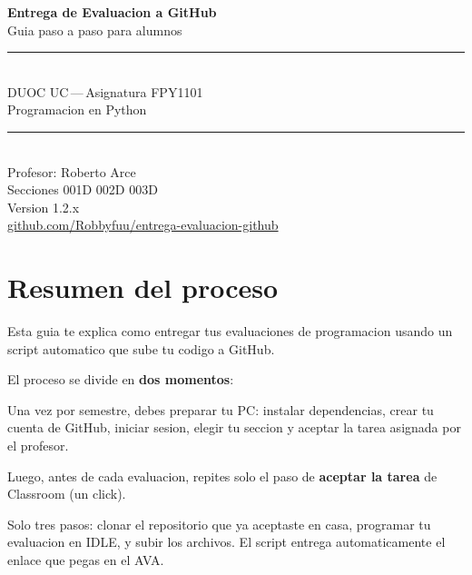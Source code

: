 \documentclass[11pt,a4paper,oneside]{report}
\begin{document}
\sloppy

\begin{titlepage}
\centering
\vspace*{2cm}

{\color{primary}\Huge\bfseries Entrega de Evaluacion a GitHub}\\[8pt]
{\color{accent}\LARGE Guia paso a paso para alumnos}\\[2.5cm]

\rule{0.7\textwidth}{0.8pt}\\[10pt]
{\large DUOC UC\,---\,Asignatura FPY1101}\\[4pt]
{\large Programacion en Python}\\[10pt]
\rule{0.7\textwidth}{0.8pt}\\[3cm]

{\large Profesor: Roberto Arce}\\[8pt]
{\large Secciones 001D \textbullet{} 002D \textbullet{} 003D}\\[3cm]

{\small Version 1.2.x}\\[4pt]
{\small \href{https://github.com/Robbyfuu/entrega-evaluacion-github}{github.com/Robbyfuu/entrega-evaluacion-github}}\\

\vfill
\end{titlepage}

\tableofcontents
\clearpage

\chapter{Resumen del proceso}

Esta guia te explica como entregar tus evaluaciones de programacion usando un script automatico que sube tu codigo a GitHub.

El proceso se divide en \textbf{dos momentos}:

\begin{notebox}
Una vez por semestre, debes preparar tu PC: instalar dependencias, crear tu cuenta de GitHub, iniciar sesion, elegir tu seccion y aceptar la tarea asignada por el profesor.

Luego, antes de cada evaluacion, repites solo el paso de \textbf{aceptar la tarea} de Classroom (un click).
\end{notebox}

\begin{successbox}
Solo tres pasos: clonar el repositorio que ya aceptaste en casa, programar tu evaluacion en IDLE, y subir los archivos. El script entrega automaticamente el enlace que pegas en el AVA.
\end{successbox}
\end{document}
